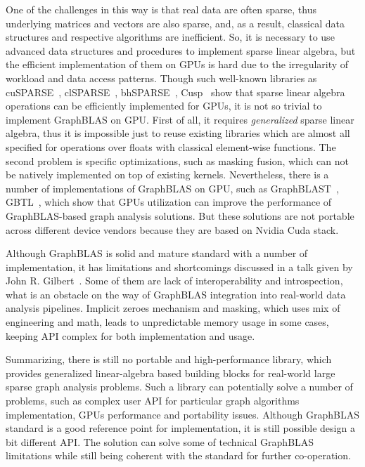 One of the challenges in this way is that real data are often sparse, thus underlying matrices and vectors are also sparse, and, as a result, classical data structures and respective algorithms are inefficient. So, it is necessary to use advanced data structures and procedures to implement sparse linear algebra, but the efficient implementation of them on GPUs is hard due to the irregularity of workload and data access patterns. Though such well-known libraries as cuSPARSE~\cite{net:cusparse_docs}, clSPARSE~\cite{article:clsparse}, bhSPARSE~\cite{article:bhsparse}, Cusp~\cite{net:cusplibrary} show that sparse linear algebra operations can be efficiently implemented for GPUs, it is not so trivial to implement GraphBLAS on GPU. First of all, it requires \textit{generalized} sparse linear algebra, thus it is impossible just to reuse existing libraries which are almost all specified for operations over floats with classical element-wise functions. The second problem is specific optimizations, such as masking fusion, which can not be natively implemented on top of existing kernels. Nevertheless, there is a number of implementations of GraphBLAS on GPU, such as GraphBLAST~\cite{yang2019graphblast}, GBTL~\cite{article:gbtl}, which show that GPUs utilization can improve the performance of GraphBLAS-based graph analysis solutions. But these solutions are not portable across different device vendors because they are based on Nvidia Cuda stack.

Although GraphBLAS is solid and mature standard with a number of implementation, it has limitations and shortcomings discussed in a talk given by John R. Gilbert~\cite{talk:graphblas_did_wrong}. Some of them are lack of interoperability and introspection, what is an obstacle on the way of GraphBLAS integration into real-world data analysis pipelines. Implicit zeroes mechanism and masking, which uses mix of engineering and math, leads to unpredictable memory usage in some cases, keeping API complex for both implementation and usage.

Summarizing, there is still no portable and high-performance library, which provides generalized linear-algebra based building blocks for real-world large sparse graph analysis problems. Such a library can potentially solve a number of problems, such as complex user API for particular graph algorithms implementation, GPUs performance and portability issues. Although GraphBLAS standard is a good reference point for implementation, it is still possible design a bit different API. The solution can solve some of technical GraphBLAS limitations while still being coherent with the standard for further co-operation.  